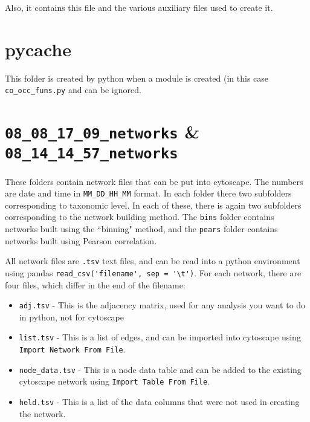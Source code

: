 \documentclass[10pt]{article}
\theoremstyle{definition}
\numberwithin{theorem}{section}
\numberwithin{definition}{section}
\numberwithin{lemma}{section}
\numberwithin{corollary}{section}
\numberwithin{clm}{section}
\numberwithin{rmk}{section}
\begin{document}
Also, it contains this file and the various auxiliary files used to create it.

\section{pycache}
This folder is created by python when a module is created (in this case \verb|co_occ_funs.py| and can be ignored.

\cprotect \section{\verb|08_08_17_09_networks| \& \verb|08_14_14_57_networks|}
These folders contain network files that can be put into cytoscape. The numbers are date and time in \verb|MM_DD_HH_MM| format. In each folder there two subfolders corresponding to taxonomic level. In each of these, there is again two subfolders corresponding to the network building method. The \verb|bins| folder contains networks built using the ``binning" method, and the \verb|pears| folder contains networks built using Pearson correlation. 

All network files are \verb|.tsv| text files, and can be read into a python environment using pandas \verb|read_csv('filename', sep = '\t')|. For each network, there are four files, which differ in the end of the filename:
\begin{itemize}
	\item \verb|adj.tsv| - This is the adjacency matrix, used for any analysis you want to do in python, not for cytoscape
	\item \verb|list.tsv| - This is a list of edges, and can be imported into cytoscape using \verb|Import Network From File|.
	\item \verb|node_data.tsv| - This is a node data table and can be added to the existing cytoscape network using \verb|Import Table From File|. 
	\item \verb|held.tsv| - This is a list of the data columns that were not used in creating the network.
\end{itemize}
\end{document}
